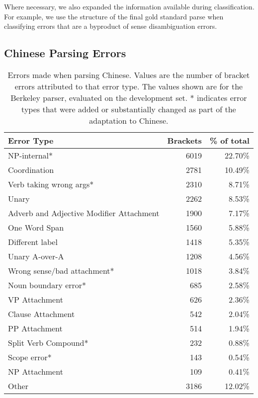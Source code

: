 Where necessary, we also expanded the information available during
classification.  For example, we use the structure of the final gold standard
parse when classifying errors that are a byproduct of sense disambiguation
errors.

\subsection{Chinese Parsing Errors} \label{sec:chinese_parsing_errors}

\begin{table}
\centering
\begin{tabular}{lrr}
  \hline
  Error Type & Brackets & \% of total \\
  \hline
  \hline
              NP-internal* & 6019 & 22.70\% \\
              Coordination & 2781 & 10.49\% \\
   Verb taking wrong args* & 2310 &  8.71\% \\
                     Unary & 2262 &  8.53\% \\
Adverb and Adjective Modifier Attachment & 1900 &  7.17\% \\
             One Word Span & 1560 &  5.88\% \\
           Different label & 1418 &  5.35\% \\
            Unary A-over-A & 1208 &  4.56\% \\
   Wrong sense/bad attachment* & 1018 &  3.84\% \\
      Noun boundary error* &  685 &  2.58\% \\
             VP Attachment &  626 &  2.36\% \\
         Clause Attachment &  542 &  2.04\% \\
             PP Attachment &  514 &  1.94\% \\
      Split Verb Compound* &  232 &  0.88\% \\
              Scope error* &  143 &  0.54\% \\
             NP Attachment &  109 &  0.41\% \\
                     Other & 3186 & 12.02\% \\
\hline
\end{tabular}
\caption[Breakdown of errors in Chinese parsing.]{ \label{tab:errors} 
  Errors made when parsing Chinese. Values are the number of bracket errors
  attributed to that error type. The values shown are for the Berkeley parser,
  evaluated on the development set. * indicates error types that were added or
  substantially changed as part of the adaptation to Chinese.
}
\end{table}


